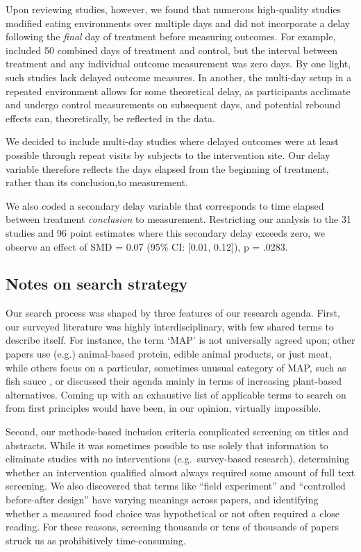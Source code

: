 \documentclass[sn-nature,referee,pdflatex]{sn-jnl}
\begin{document}
Upon reviewing studies, however, we found that numerous high-quality
studies modified eating environments over multiple days and did not
incorporate a delay following the \emph{final} day of treatment before
measuring outcomes. For example, \citep{andersson2021} included 50
combined days of treatment and control, but the interval between
treatment and any individual outcome measurement was zero days. By one
light, such studies lack delayed outcome measures. In another, the
multi-day setup in a repeated environment allows for some theoretical
delay, as participants acclimate and undergo control measurements on
subsequent days, and potential rebound effects can, theoretically, be
reflected in the data.

We decided to include multi-day studies where delayed outcomes were at
least possible through repeat visits by subjects to the intervention
site. Our delay variable therefore reflects the days elapsed from the
beginning of treatment, rather than its conclusion,to measurement.

We also coded a secondary delay variable that corresponds to time
elapsed between treatment \emph{conclusion} to measurement. Restricting
our analysis to the 31 studies and 96 point estimates where this
secondary delay exceeds zero, we observe an effect of SMD = 0.07 (95\%
CI: {[}0.01, 0.12{]}), p = .0283.

\subsection{Notes on search strategy}\label{Sec5.2}

Our search process was shaped by three features of our research agenda.
First, our surveyed literature was highly interdisciplinary, with few
shared terms to describe itself. For instance, the term `MAP' is not
universally agreed upon; other papers use (e.g.) animal-based protein,
edible animal products, or just meat, while others focus on a
particular, sometimes unusual category of MAP, such as fish sauce
\citep{kanchanachitra2020}, or discussed their agenda mainly in terms of
increasing plant-based alternatives. Coming up with an exhaustive list
of applicable terms to search on from first principles would have been,
in our opinion, virtually impossible.

Second, our methods-based inclusion criteria complicated screening on
titles and abstracts. While it was sometimes possible to use solely that
information to eliminate studies with no interventions
(e.g.~survey-based research), determining whether an intervention
qualified almost always required some amount of full text screening. We
also discovered that terms like ``field experiment'' and ``controlled
before-after design'' have varying meanings across papers, and
identifying whether a measured food choice was hypothetical or not often
required a close reading. For these reasons, screening thousands or tens
of thousands of papers struck us as prohibitively time-consuming.
\end{document}
